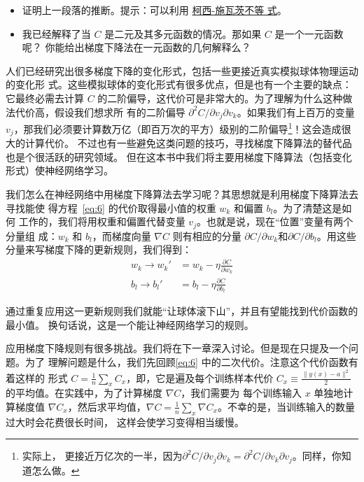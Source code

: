 \begin{itemize}
\item 证明上一段落的推断。提示：可以利用%
  \href{http://en.wikipedia.org/wiki/Cauchy–Schwarz_inequality}{柯西-施瓦茨不等
    式}。
\item 我已经解释了当 $C$ 是二元及其多元函数的情况。那如果 $C$ 是一个一元函数呢？
  你能给出梯度下降法在一元函数的几何解释么？
\end{itemize}

人们已经研究出很多梯度下降的变化形式，包括一些更接近真实模拟球体物理运动的变化形
式。这些模拟球体的变化形式有很多优点，但是也有一个主要的缺点：它最终必需去计算
$C$ 的二阶偏导，这代价可是非常大的。为了理解为什么这种做法代价高，假设我们想求所
有的二阶偏导 $\partial^2 C/ \partial v_j \partial v_k$。如果我们有上百万的变量
$v_j$，那我们必须要计算数万亿（即百万次的平方）级别的二阶偏导\footnote{实际上，
  更接近万亿次的一半，因为$\partial^2 C/ \partial v_j \partial v_k = \partial^2
  C/ \partial v_k \partial v_j$。同样，你知道怎么做。}！这会造成很大的计算代价。
不过也有一些避免这类问题的技巧，寻找梯度下降算法的替代品也是个很活跃的研究领域。
但在这本书中我们将主要用梯度下降算法（包括变化形式）使神经网络学习。

我们怎么在神经网络中用梯度下降算法去学习呢？其思想就是利用梯度下降算法去寻找能使
得方程~\eqref{eq:6} 的代价取得最小值的权重 $w_k$ 和偏置 $b_l$。为了清楚这是如何
工作的，我们将用权重和偏置代替变量 $v_j$。也就是说，现在“位置”变量有两个分量组
成：$w_k$ 和 $b_l$，而梯度向量 $\nabla C$ 则有相应的分量 $\partial C / \partial
w_k$和$\partial C / \partial b_l$。用这些分量来写梯度下降的更新规则，我们得到：
\begin{align}
  \label{eq:16}w_k \rightarrow w_k' &= w_k-\eta \frac{\partial C}{\partial w_k}\tag{16}\\
  \label{eq:17}b_l \rightarrow b_l' &= b_l-\eta \frac{\partial C}{\partial b_l}\tag{17}
\end{align}

通过重复应用这一更新规则我们就能“让球体滚下山”，并且有望能找到代价函数的最小值。
换句话说，这是一个能让神经网络学习的规则。

应用梯度下降规则有很多挑战。我们将在下一章深入讨论。但是现在只提及一个问题。为了
理解问题是什么，我们先回顾\eqref{eq:6} 中的二次代价。注意这个代价函数有着这样的
形式 $C = \frac{1}{n} \sum_x C_x$，即，它是遍及每个训练样本代价 $C_x \equiv
\frac{\|y(x)-a\|^2}{2}$ 的平均值。在实践中，为了计算梯度 $\nabla C$，我们需要为
每个训练输入 $x$ 单独地计算梯度值 $\nabla C_x$，然后求平均值，$\nabla C =
\frac{1}{n} \sum_x \nabla C_x$。不幸的是，当训练输入的数量过大时会花费很长时间，
这样会使学习变得相当缓慢。

